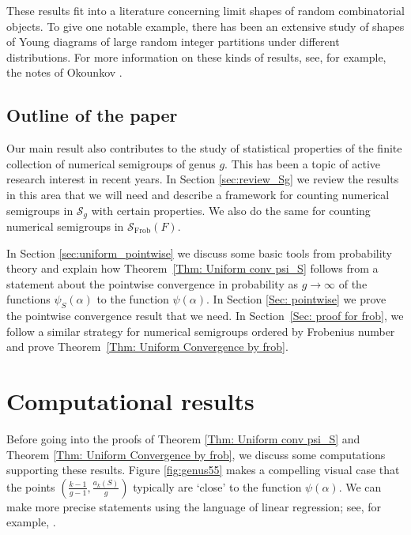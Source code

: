 \documentclass[12pt]{amsart}
\def\SS{{\mathcal S}}
\newcommand{\Frob}{\text{Frob}}
\begin{document}
These results fit into a literature concerning limit shapes of random combinatorial objects.  To give one notable example, there has been an extensive study of shapes of Young diagrams of large random integer partitions under different distributions.  For more information on these kinds of results, see, for example, the notes of Okounkov \cite{Okounkov}.  

\subsection{Outline of the paper}

Our main result also contributes to the study of statistical properties of the finite collection of numerical semigroups of genus $g$. This has been a topic of active research interest in recent years.  In Section \ref{sec:review_Sg} we review the results in this area that we will need and describe a framework for counting numerical semigroups in $\SS_g$ with certain properties. We also do the same for counting numerical semigroups in $\SS_{\Frob}(F)$.

In Section \ref{sec:uniform_pointwise} we discuss some basic tools from probability theory and explain how Theorem~\ref{Thm: Uniform conv psi_S} follows from a statement about the pointwise convergence in probability as $g \rightarrow \infty$ of the functions $\psi_S(\alpha)$ to the function $\psi(\alpha)$.  In Section \ref{Sec: pointwise} we prove the pointwise convergence result that we need.
In Section~\ref{Sec: proof for frob}, we follow a similar strategy for numerical semigroups ordered by Frobenius number and prove Theorem~\ref{Thm: Uniform Convergence by frob}.

\section{Computational results}

Before going into the proofs of Theorem \ref{Thm: Uniform conv psi_S} and Theorem \ref{Thm: Uniform Convergence by frob}, we discuss some computations supporting these results.  Figure \eqref{fig:genus55} makes a compelling visual case that the points $\left(\frac{k-1}{g-1},\frac{a_k(S)}{g}\right)$ typically are `close' to the function $\psi(\alpha)$.  We can make more precise statements using the language of linear regression; see, for example, \cite{montgomery2021introduction}.
\end{document}
